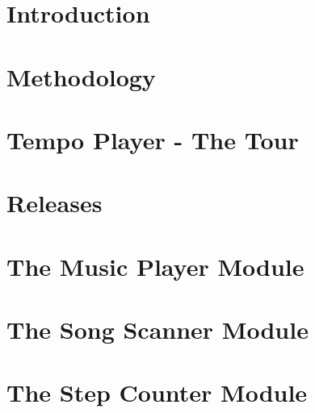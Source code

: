 



\frontmatter 

\cleardoublepage

\cleardoublepage

\cleardoublepage


\mainmatter



\chapter{Introduction}
\label{chap:intro}



\chapter{Methodology}
\label{chap:methodology}


\chapter{Tempo Player - The Tour}
\label{chap:tempoPlayer}



\chapter{Releases}
\label{chap:iteration}


\chapter{The Music Player Module}
\label{chap:musicPlayer}


\chapter{The Song Scanner Module}
\label{chap:songScanner}


\chapter{The Step Counter Module}
\label{chap:stepCounter}


